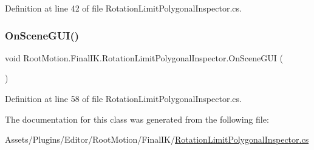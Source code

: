 Definition at line 42 of file Rotation\+Limit\+Polygonal\+Inspector.\+cs.

\mbox{\label{class_root_motion_1_1_final_i_k_1_1_rotation_limit_polygonal_inspector_aeab7590fd9b3e2f687c80ac1f9038586}} 
\subsubsection{\texorpdfstring{On\+Scene\+G\+U\+I()}{OnSceneGUI()}}
{\footnotesize\ttfamily void Root\+Motion.\+Final\+I\+K.\+Rotation\+Limit\+Polygonal\+Inspector.\+On\+Scene\+G\+UI (\begin{DoxyParamCaption}{ }\end{DoxyParamCaption})}



Definition at line 58 of file Rotation\+Limit\+Polygonal\+Inspector.\+cs.



The documentation for this class was generated from the following file\+:\begin{DoxyCompactItemize}
\item 
Assets/\+Plugins/\+Editor/\+Root\+Motion/\+Final\+I\+K/\mbox{\hyperlink{_rotation_limit_polygonal_inspector_8cs}{Rotation\+Limit\+Polygonal\+Inspector.\+cs}}\end{DoxyCompactItemize}
